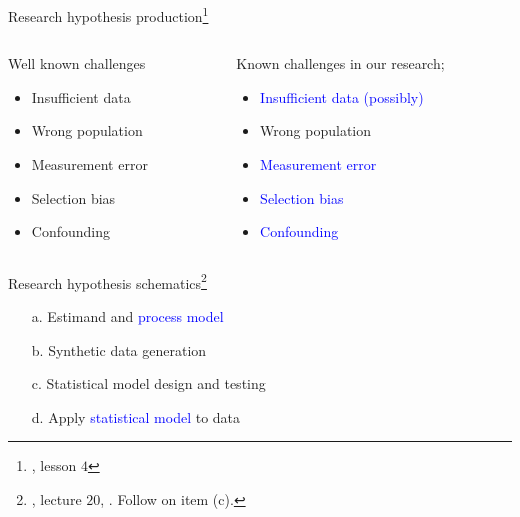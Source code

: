 \begin{frame}
	{Research hypothesis production\footnote{\citet{Hernan_2020}, lesson $4$}}
	\begin{columns}
		\begin{column}{0.5\textwidth}
			Well known challenges
			\begin{itemize}
				\item Insufficient data
				\item Wrong population
				\item Measurement error
				\item Selection bias
				\item Confounding
			\end{itemize} 
		\end{column}
		\begin{column}{0.5\textwidth} 
			Known challenges in our research;
			\begin{itemize}
				\item \textcolor{blue}{Insufficient data (possibly)}
				\item Wrong population
				\item \textcolor{blue}{Measurement error}
				\item \textcolor{blue}{Selection bias}
				\item \textcolor{blue}{Confounding}
			\end{itemize} 
		\end{column}
	\end{columns}
\end{frame}
%
%
\begin{lhframe}[rhgraphic={\texttt{[image: lab\_to\_research.png]}}]
	{Research hypothesis schematics\footnote{\citet{McElreath_2022}, lecture $20$, \citet{Pearl_2019}. Follow \citet{Fogarty_et_al_2022} on item (c).}}
	
	\begin{enumerate}
		\item[a.] Estimand and \textcolor{blue}{process model}
		\item[b.] Synthetic data generation
		\item[c.] Statistical model design and testing
		\item[d.] Apply \textcolor{blue}{statistical model} to data 
	\end{enumerate} 
\end{lhframe}
%
%
